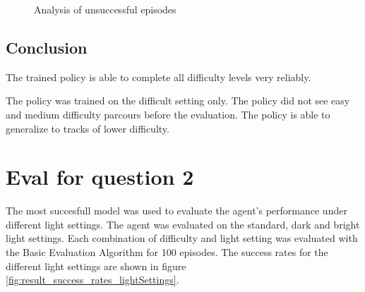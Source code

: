 \begin{figure}
    \centering
    \caption{Analysis of unsuccessful episodes}
    \label{fig:unsuccessful_episodes}
\end{figure}



\subsection{Conclusion}

The trained policy is able to complete all difficulty levels very reliably.

The policy was trained on the difficult setting only. The policy did not see easy and medium difficulty parcours before the evaluation. The policy is able to generalize to tracks of lower difficulty.

\section{Eval for question 2}

The most succesfull model was used to evaluate the agent's performance under different light settings. The agent was evaluated on the standard, dark and bright light settings. Each combination of difficulty and light setting was evaluated with the Basic Evaluation Algorithm for 100 episodes. The success rates for the different light settings are shown in figure \ref{fig:result_success_rates_lightSettings}.


